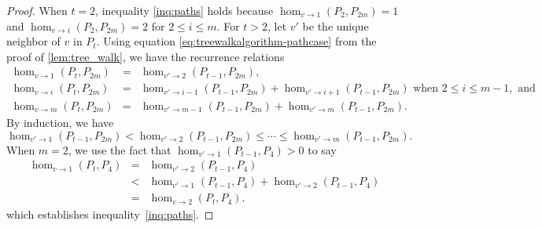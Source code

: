 \documentclass[11pt]{article}
\theoremstyle{definition}
\newcommand{\homclass}[4]{\hom_{#1\to#2}(#3,#4)}
\begin{document}
\begin{proof}
When $t=2$, inequality \eqref{inq:paths} holds because $\homclass{v}{1}{P_2}{P_{2m}}=1$ and $\homclass{v}{i}{P_2}{P_{2m}}=2$ for $2 \le i \le m$. For $t > 2$, let $v'$ be the unique neighbor of $v$ in $P_t$. Using equation \eqref{eq:treewalkalgorithm-pathcase} from the proof of \cref{lem:tree_walk}, we have the recurrence relations
\begin{eqnarray*}
\homclass{v}{1}{P_t}{P_{2m}} & = & \homclass{v'}{2}{P_{t-1}}{P_{2m}}, \\
\homclass{v}{i}{P_t}{P_{2m}} & = & \homclass{v'}{i-1}{P_{t-1}}{P_{2m}} + \homclass{v'}{i+1}{P_{t-1}}{P_{2m}} \text{ when } 2 \le i \le m-1, \text{ and} \\
\homclass{v}{m}{P_t}{P_{2m}} & = & \homclass{v'}{m-1}{P_{t-1}}{P_{2m}} + \homclass{v'}{m}{P_{t-1}}{P_{2m}}.
\end{eqnarray*}
By induction, we have
\begin{equation}\label{inq:path_induction}
\homclass{v'}{1}{P_{t-1}}{P_{2m}} < \homclass{v'}{2}{P_{t-1}}{P_{2m}} \le \cdots \le \homclass{v'}{m}{P_{t-1}}{P_{2m}}.
\end{equation}
When $m=2$, we use the fact that $\homclass{v'}{1}{P_{t-1}}{P_{4}} > 0$ to say
\begin{eqnarray*}
\homclass{v}{1}{P_t}{P_{4}} &=& \homclass{v'}{2}{P_{t-1}}{P_{4}} \\
	&<& \homclass{v'}{1}{P_{t-1}}{P_{4}} + \homclass{v'}{2}{P_{t-1}}{P_{4}} \\
	&=& \homclass{v}{2}{P_t}{P_4}.
\end{eqnarray*}
which establishes inequality~\eqref{inq:paths}.


\end{proof}
\end{document}

